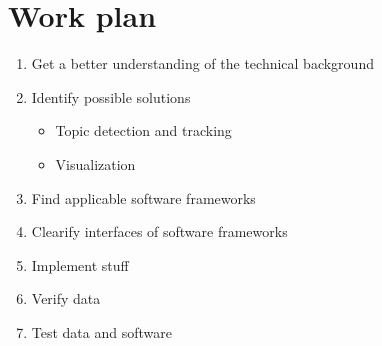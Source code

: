\section{Work plan}\label{sec:plan}


\begin{enumerate}
	\item Get a better understanding of the technical background
	\item Identify possible solutions
	\begin{itemize}
		\item Topic detection and tracking
		\item Visualization
	\end{itemize}
	\item Find applicable software frameworks
	\item Clearify interfaces of software frameworks
	\item Implement stuff
	\item Verify data
	\item Test data and software
\end{enumerate}

